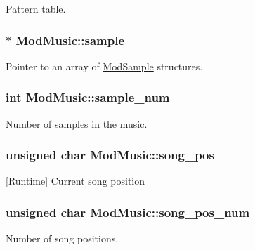 Pattern table. 

\hypertarget{structModMusic_a9e2b2e857708204d12e33d10ef467e3c}{}
\subsubsection[{sample}]{$\ast$ Mod\+Music\+::sample}\label{structModMusic_a9e2b2e857708204d12e33d10ef467e3c}


Pointer to an array of \hyperlink{structModSample}{Mod\+Sample} structures. 

\hypertarget{structModMusic_a48e325665c0b710768b8310d8e3ab1f9}{}
\subsubsection[{sample\+\_\+num}]{\setlength{\rightskip}{0pt plus 5cm}int Mod\+Music\+::sample\+\_\+num}\label{structModMusic_a48e325665c0b710768b8310d8e3ab1f9}


Number of samples in the music. 

\hypertarget{structModMusic_acece3d1a6fa99389d79490b812be31ba}{}
\subsubsection[{song\+\_\+pos}]{\setlength{\rightskip}{0pt plus 5cm}unsigned char Mod\+Music\+::song\+\_\+pos}\label{structModMusic_acece3d1a6fa99389d79490b812be31ba}


\mbox{[}Runtime\mbox{]} Current song position 

\hypertarget{structModMusic_a314b376f9b8b67475b70d1e3579da361}{}
\subsubsection[{song\+\_\+pos\+\_\+num}]{\setlength{\rightskip}{0pt plus 5cm}unsigned char Mod\+Music\+::song\+\_\+pos\+\_\+num}\label{structModMusic_a314b376f9b8b67475b70d1e3579da361}


Number of song positions. 

